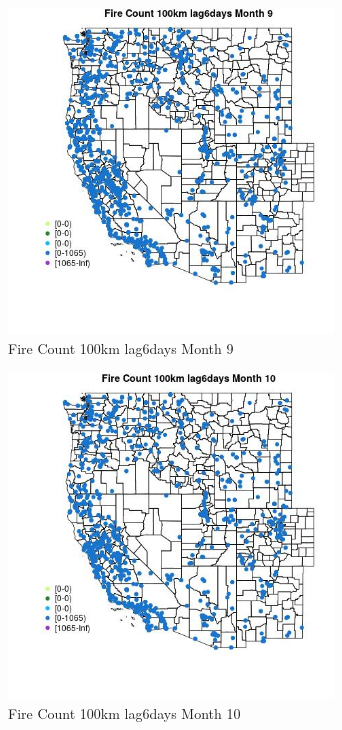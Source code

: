 \begin{figure} 
\centering  
\includegraphics[width=0.77\textwidth]{Code_Outputs/Report_ML_input_PM25_Step4_part_f_de_duplicated_aveswNAs_MapObsMo9Fire_Count_100km_lag6days.jpg} 
\caption{\label{fig:Report_ML_input_PM25_Step4_part_f_de_duplicated_aveswNAsMapObsMo9Fire_Count_100km_lag6days}Fire Count 100km lag6days Month 9} 
\end{figure} 
 

\begin{figure} 
\centering  
\includegraphics[width=0.77\textwidth]{Code_Outputs/Report_ML_input_PM25_Step4_part_f_de_duplicated_aveswNAs_MapObsMo10Fire_Count_100km_lag6days.jpg} 
\caption{\label{fig:Report_ML_input_PM25_Step4_part_f_de_duplicated_aveswNAsMapObsMo10Fire_Count_100km_lag6days}Fire Count 100km lag6days Month 10} 
\end{figure} 
 

